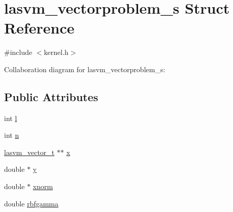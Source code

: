 \hypertarget{structlasvm__vectorproblem__s}{\section{lasvm\+\_\+vectorproblem\+\_\+s Struct Reference}
\label{structlasvm__vectorproblem__s}
}


{\ttfamily \#include $<$kernel.\+h$>$}



Collaboration diagram for lasvm\+\_\+vectorproblem\+\_\+s\+:
\subsection*{Public Attributes}
\begin{DoxyCompactItemize}
\item 
int \hyperlink{structlasvm__vectorproblem__s_a140f59bc586f1bb2ecf928084c99ff43}{l}
\item 
int \hyperlink{structlasvm__vectorproblem__s_a6dd86eacce505f90bf8b48bacd0008e1}{n}
\item 
\hyperlink{vector_8h_a48dec8e5a072b5f35bd4f8b88cdcd855}{lasvm\+\_\+vector\+\_\+t} $\ast$$\ast$ \hyperlink{structlasvm__vectorproblem__s_a621e37ab8692e05c47f0c6fc526f4dfd}{x}
\item 
double $\ast$ \hyperlink{structlasvm__vectorproblem__s_a21b068e93b4cd15dbd00895c752de5a7}{y}
\item 
double $\ast$ \hyperlink{structlasvm__vectorproblem__s_ada8b3d57f315389651fbfa92af3d6fbb}{xnorm}
\item 
double \hyperlink{structlasvm__vectorproblem__s_ab8fa1d90775a1b4251f9d4f4bce52660}{rbfgamma}
\end{DoxyCompactItemize}


